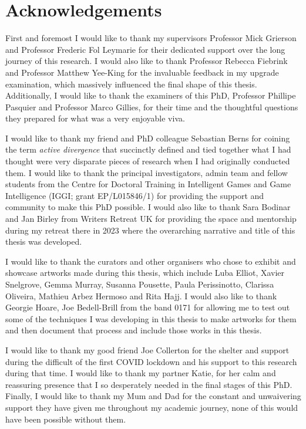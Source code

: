 \chapter*{Acknowledgements}

First and foremost I would like to thank my supervisors Professor Mick Grierson and Professor Frederic Fol Leymarie for their dedicated support over the long journey of this research. I would also like to thank Professor Rebecca Fiebrink and Professor Matthew Yee-King for the invaluable feedback in my upgrade examination, which massively influenced the final shape of this thesis. Additionally, I would like to thank the examiners of this PhD, Professor Phillipe Pasquier and Professor Marco Gillies, for their time and the thoughtful questions they prepared for what was a very enjoyable viva. 

I would like to thank my friend and PhD colleague Sebastian Berns for coining the term \textit{active divergence} that succinctly defined and tied together what I had thought were very disparate pieces of research when I had originally conducted them. I would like to thank the principal investigators, admin team and fellow students from the Centre for Doctoral Training in Intelligent Games and Game Intelligence (IGGI; grant EP/L015846/1) for providing the support and community to make this PhD possible. I would also like to thank Sara Bodinar and Jan Birley from Writers Retreat UK for providing the space and mentorship during my retreat there in 2023 where the overarching narrative and title of this thesis was developed. 

I would like to thank the curators and other organisers who chose to exhibit and showcase artworks made during this thesis, which include Luba Elliot, Xavier Snelgrove, Gemma Murray, Susanna Pousette, Paula Perissinotto, Clarissa Oliveira, Mathieu Arbez Hermoso and Rita Hajj. I would also like to thank Georgie Hoare, Joe Bedell-Brill from the band 0171 for allowing me to test out some of the techniques I was developing in this thesis to make artworks for them and then document that process and include those works in this thesis.

I would like to thank my good friend Joe Collerton for the shelter and support during the difficult of the first COVID lockdown and his support to this research during that time. I would like to thank my partner Katie, for her calm and reassuring presence that I so desperately needed in the final stages of this PhD. Finally, I would like to thank my Mum and Dad for the constant and unwaivering support they have given me throughout my academic journey, none of this would have been possible without them. 

